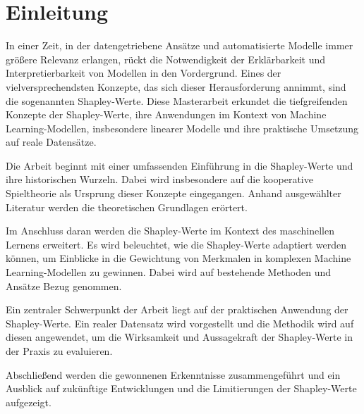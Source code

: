 \chapter{Einleitung}

In einer Zeit, in der datengetriebene Ansätze und automatisierte Modelle immer größere Relevanz erlangen, 
rückt die Notwendigkeit der Erklärbarkeit und Interpretierbarkeit von Modellen in den Vordergrund. 
Eines der vielversprechendsten Konzepte, das sich dieser Herausforderung annimmt, sind die sogenannten Shapley-Werte. 
Diese Masterarbeit erkundet die tiefgreifenden Konzepte der Shapley-Werte, ihre Anwendungen im Kontext von Machine Learning-Modellen, 
insbesondere linearer Modelle und ihre praktische Umsetzung auf reale Datensätze.

Die Arbeit beginnt mit einer umfassenden Einführung in die Shapley-Werte und ihre historischen Wurzeln. 
Dabei wird insbesondere auf die kooperative Spieltheorie als Ursprung dieser Konzepte eingegangen. 
Anhand ausgewählter Literatur werden die theoretischen Grundlagen erörtert.

Im Anschluss daran werden die Shapley-Werte im Kontext des maschinellen Lernens erweitert. 
Es wird beleuchtet, wie die Shapley-Werte adaptiert werden können, um Einblicke in die Gewichtung von Merkmalen in komplexen 
Machine Learning-Modellen zu gewinnen. Dabei wird auf bestehende Methoden und Ansätze Bezug genommen.

Ein zentraler Schwerpunkt der Arbeit liegt auf der praktischen Anwendung der Shapley-Werte. Ein realer Datensatz wird 
vorgestellt und die Methodik wird auf diesen angewendet, um die Wirksamkeit und Aussagekraft der Shapley-Werte in der 
Praxis zu evaluieren.

Abschließend werden die gewonnenen Erkenntnisse zusammengeführt und ein Ausblick auf zukünftige Entwicklungen und 
die Limitierungen der Shapley-Werte aufgezeigt.